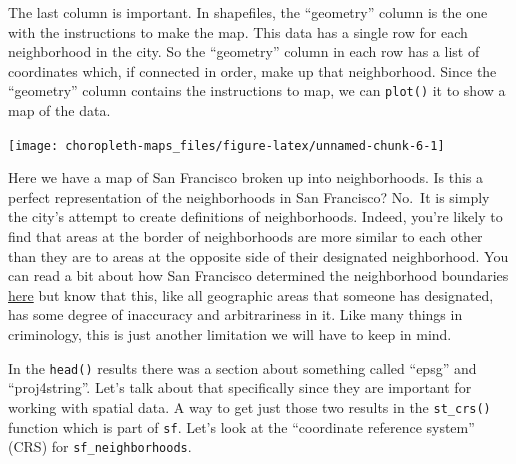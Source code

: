 \documentclass[
  12pt,
]{book}
\newenvironment{Shaded}{\begin{snugshade}}{\end{snugshade}}
\newcommand{\KeywordTok}[1]{\textcolor[rgb]{0.13,0.29,0.53}{\textbf{#1}}}
\newcommand{\NormalTok}[1]{#1}
\newcommand{\OperatorTok}[1]{\textcolor[rgb]{0.81,0.36,0.00}{\textbf{#1}}}
\begin{document}
The last column is important. In shapefiles, the ``geometry'' column is the one with the instructions to make the map. This data has a single row for each neighborhood in the city. So the ``geometry'' column in each row has a list of coordinates which, if connected in order, make up that neighborhood. Since the ``geometry'' column contains the instructions to map, we can \texttt{plot()} it to show a map of the data.

\begin{Shaded}
\end{Shaded}

\begin{center}\texttt{[image: choropleth-maps\_files/figure-latex/unnamed-chunk-6-1]} \end{center}

Here we have a map of San Francisco broken up into neighborhoods. Is this a perfect representation of the neighborhoods in San Francisco? No.~It is simply the city's attempt to create definitions of neighborhoods. Indeed, you're likely to find that areas at the border of neighborhoods are more similar to each other than they are to areas at the opposite side of their designated neighborhood. You can read a bit about how San Francisco determined the neighborhood boundaries \href{https://data.sfgov.org/Geographic-Locations-and-Boundaries/Analysis-Neighborhoods/p5b7-5n3h}{here} but know that this, like all geographic areas that someone has designated, has some degree of inaccuracy and arbitrariness in it. Like many things in criminology, this is just another limitation we will have to keep in mind.

In the \texttt{head()} results there was a section about something called ``epsg'' and ``proj4string''. Let's talk about that specifically since they are important for working with spatial data. A way to get just those two results in the \texttt{st\_crs()} function which is part of \texttt{sf}. Let's look at the ``coordinate reference system'' (CRS) for \texttt{sf\_neighborhoods}.
\end{document}
